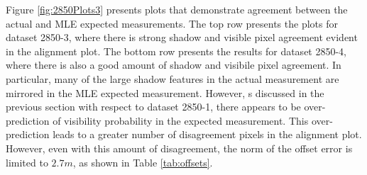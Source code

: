 Figure \ref{fig:2850Plots3} presents plots that demonstrate agreement between the actual and MLE expected measurements.  
The top row presents the plots for dataset 2850-3, where there is strong shadow and visible pixel agreement evident in the alignment plot.
The bottom row presents the results for dataset 2850-4, where there is also a good amount of shadow and visibile pixel agreement.
In particular, many of the large shadow features in the actual measurement are mirrored in the MLE expected measurement.
However, s discussed in the previous section with respect to dataset 2850-1, there appears to be over-prediction of visibility probability in the expected measurement. 
This over-prediction leads to a greater number of disagreement pixels in the alignment plot.
However, even with this amount of disagreement, the norm of the offset error is limited to $2.7m$, as shown in Table \ref{tab:offsets}.

